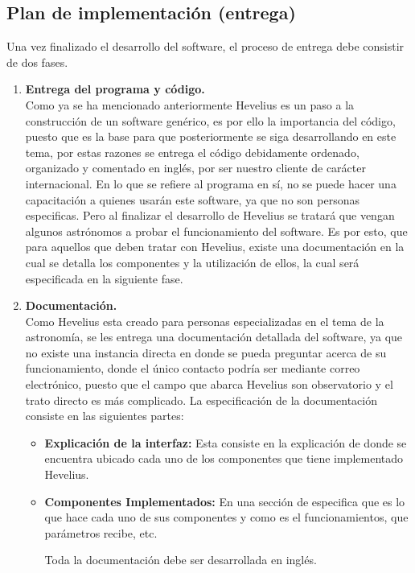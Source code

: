 \documentclass[letterpaper,spanish,10pt]{article}
\begin{document}
\subsection{Plan de implementaci\'on (entrega)}
Una vez finalizado el desarrollo del software, el proceso de entrega debe consistir de dos fases.
\begin{enumerate}
	\item {\bf{Entrega del programa y c\'odigo.}}\\
         Como ya se ha mencionado anteriormente Hevelius es un paso a la construcci\'on de un software gen\'erico, es por ello la importancia del c\'odigo, puesto que es la base para que posteriormente se siga desarrollando en este tema, por estas razones se entrega el c\'odigo debidamente ordenado, organizado y comentado en ingl\'es, por  ser nuestro cliente de car\'acter internacional.
    En lo que se refiere al programa en s\'i, no se puede hacer una capacitaci\'on a quienes usar\'an este software, ya que no son personas especificas. Pero al finalizar el desarrollo de Hevelius se tratar\'a que vengan algunos astr\'onomos a probar el funcionamiento del software. Es por esto, que para aquellos que deben tratar con Hevelius, existe una documentaci\'on en la cual se detalla los componentes y la utilizaci\'on de ellos, la cual ser\'a especificada en la siguiente fase.\\

	\item{\bf{Documentaci\'on.}}\\
         Como Hevelius esta creado para personas especializadas en el tema de la astronom\'ia, se les entrega una documentaci\'on detallada del software, ya que no existe una instancia directa en donde se pueda preguntar acerca de su funcionamiento, donde el \'unico contacto podr\'ia ser mediante correo electr\'onico, puesto que el campo que abarca Hevelius son observatorio y el trato directo es m\'as complicado.
La especificaci\'on de la documentaci\'on consiste en las siguientes partes:
\begin{itemize}
	\item {\bf{Explicaci\'on de la interfaz:}} Esta consiste en la explicaci\'on de donde se encuentra ubicado cada uno de los componentes que tiene implementado Hevelius.
	\item{ \bf{Componentes Implementados:}} En una secci\'on de especifica que es lo que hace cada uno de sus componentes y como es el funcionamientos, que par\'ametros recibe, etc.

Toda la documentaci\'on debe ser desarrollada en ingl\'es.
\end{itemize}
\end{enumerate}
\end{document}
